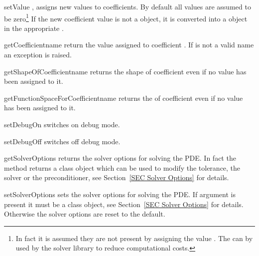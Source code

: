 \begin{methoddesc}[LinearPDE]{setValue}{
,
}
assigns new values to coefficients. By default all values are assumed to be zero\footnote{
In fact it is assumed they are not present by assigning the value . The
can by used by the solver library to reduce computational costs.
}
If the new coefficient value is not a \Data object, it is converted into a \Data object in the
appropriate \FunctionSpace.
\end{methoddesc}

\begin{methoddesc}[LinearPDE]{getCoefficient}{name}
return the value assigned to coefficient . If  is not a valid name
an exception is raised.
\end{methoddesc}

\begin{methoddesc}[LinearPDE]{getShapeOfCoefficient}{name}
returns the shape of coefficient  even if no value has been assigned to it.
\end{methoddesc}

\begin{methoddesc}[LinearPDE]{getFunctionSpaceForCoefficient}{name}
returns the \FunctionSpace of coefficient  even if no value has been assigned to it.
\end{methoddesc}

\begin{methoddesc}[LinearPDE]{setDebugOn}{}
switches on debug mode.
\end{methoddesc}

\begin{methoddesc}[LinearPDE]{setDebugOff}{}
switches off debug mode.
\end{methoddesc}

\begin{methoddesc}[LinearPDE]{getSolverOptions}{}
returns the solver options for solving the PDE. In fact the method returns
a \SolverOptions class object which can be used to modify the tolerance, 
the solver or the preconditioner, see Section~\ref{SEC Solver Options} for details.
\end{methoddesc}

\begin{methoddesc}[LinearPDE]{setSolverOptions}{}
sets the solver options for solving the PDE. If argument  is present it
must be a \SolverOptions class object, see Section~\ref{SEC Solver Options} for details. Otherwise the solver options are reset to the default.
\end{methoddesc}


